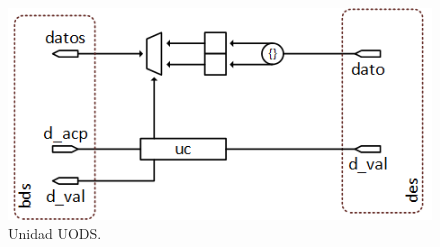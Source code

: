 \begin{figure}
	\begin{center}
		\includegraphics[scale=0.9]{figures/ch4_bloque_salida_des.png}
	\end{center}
	\caption
		{	
			Unidad UODS.
		}
	\label{fig:ch4_bloque_salida_des}
\end{figure}

 
